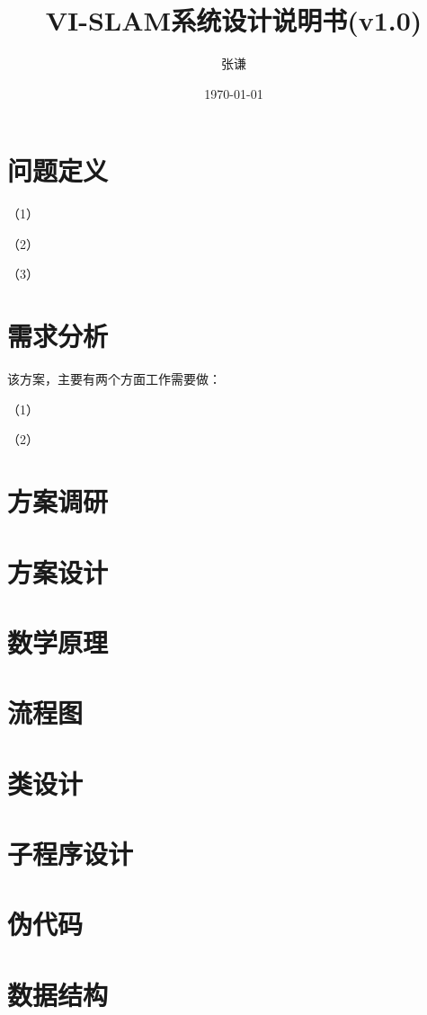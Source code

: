 \documentclass{article}
\title{VI-SLAM系统设计说明书(v1.0)}
\author{张谦}
\date{\today}
\begin{document}
\maketitle
\tableofcontents
\newpage

\section{问题定义}

\par
（1）
\par
（2）
\par
（3）

\section{需求分析}
该方案，主要有两个方面工作需要做：
\par
（1）
\par
（2）

\section{方案调研}


\section{方案设计}

\section{数学原理}

\section{流程图}

\section{类设计}

\section{子程序设计}

\section{伪代码}

\section{数据结构}
\end{document}
